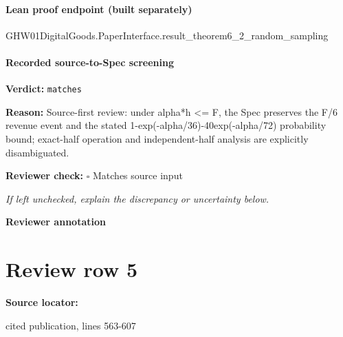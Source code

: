 \documentclass[10pt]{article}
\newcommand{\reviewerbox}{%
  \par\noindent\fbox{\parbox{0.96\linewidth}{\rule{0pt}{0.38in}}}\par
}
\newcommand{\reviewmatch}[1]{%
  \par\noindent\textbf{Reviewer check:} $\square$\; #1\par
  \noindent\emph{If left unchecked, explain the discrepancy or uncertainty below.}\par
}
\begin{document}
\paragraph{Lean proof endpoint (built separately)}\begin{ReviewVerbatim}
GHW01DigitalGoods.PaperInterface.result_theorem6_2_random_sampling
\end{ReviewVerbatim}

\paragraph{Recorded source-to-Spec screening}
\textbf{Verdict:} \texttt{matches}
\\
{\raggedright
\textbf{Reason:} Source-\allowbreak{}first review:\allowbreak{} under alpha*h <= F, the Spec preserves the F/\allowbreak{}6 revenue event and the stated 1-\allowbreak{}exp(-\allowbreak{}alpha/\allowbreak{}36)-\allowbreak{}40exp(-\allowbreak{}alpha/\allowbreak{}72) probability bound;\allowbreak{} exact-\allowbreak{}half operation and independent-\allowbreak{}half analysis are explicitly disambiguated.\allowbreak{}
\par}
\reviewmatch{Matches source input}
\noindent\textbf{Reviewer annotation}\par
\reviewerbox
\clearpage
\hypertarget{source-claim-f07b3322ac4a8773}{}
\section*{Review row 5}
\textbf{Source locator:} {\footnotesize\raggedright cited publication, lines 563-\allowbreak{}607\par}
\end{document}
